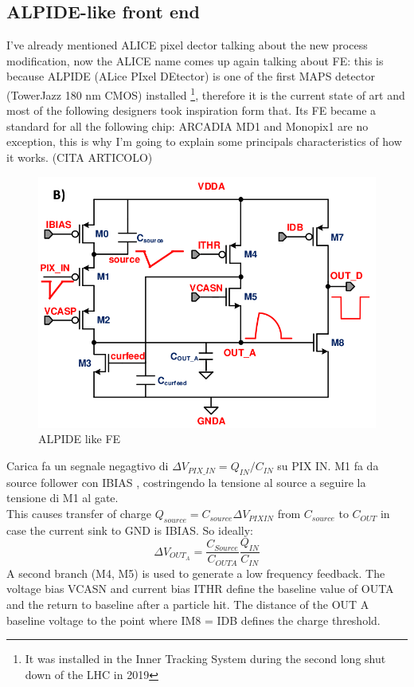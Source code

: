 \subsection{ALPIDE-like front end}
I've already mentioned ALICE pixel dector talking about the new process modification, now the ALICE name comes up again talking about FE: this is because ALPIDE (ALice PIxel DEtector) is one of the first MAPS detector (TowerJazz 180 nm CMOS) installed \footnote{It was installed in the Inner Tracking System during the second long shut down of the LHC in 2019}, therefore it is the current state of art and most of the following designers took inspiration form that. Its FE became a standard for all the following chip: ARCADIA MD1 and Monopix1 are no exception, this is why I'm going to explain some principals characteristics of how it works. (CITA ARTICOLO)
\begin{figure}[h!]
   \centering
   \includegraphics[width=.7\linewidth]{figures/ALPIDE_FE.png}
   \caption{ALPIDE like FE}
   \label{fig:ALPIDE-like}
\end{figure}

Carica fa un segnale negagtivo di $\Delta V_{PIX\_IN} = Q_{IN}/C_{IN}$ su PIX IN. 
M1 fa da source follower con IBIAS , costringendo la tensione al source a seguire la tensione di M1
al gate. \\
This causes transfer of charge 
$Q_{source}=C_{source}\Delta V_{PIXIN}$ from $C_{source}$ to $C_{OUT}$ in case the current sink
to GND is IBIAS.
So ideally:
\begin{equation}
   \Delta V_{OUT_A} = \frac{C_{Source}}{C_{OUTA}}\frac{Q_{IN}}{C_{IN}}
\end{equation}
A second branch (M4, M5) is used to generate a low frequency feedback. 
The voltage bias
VCASN and current bias ITHR define the baseline value of OUTA and the return to baseline after
a particle hit. The distance of the OUT A baseline voltage to the point where
IM8 = IDB defines the charge threshold.
  
